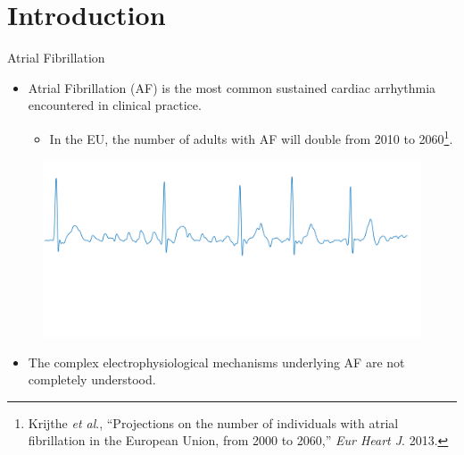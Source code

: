 \documentclass{beamer}
\begin{document}
	\begin{frame}
		\tableofcontents
	\end{frame}


\section{Introduction} 


	\begin{frame}{Atrial Fibrillation}	
		
		\begin{itemize}
			\item Atrial Fibrillation (AF) is the most common sustained cardiac arrhythmia encountered in clinical practice.
			\begin{itemize}
				\item  In the EU, the number of adults with AF will double from 2010 to 2060\footnote{Krijthe \textit{et al}., ``Projections on the number of individuals with atrial fibrillation in the European Union, from 2000 to 2060,'' \textit{Eur Heart J}. 2013.}.
			\end{itemize}
		\end{itemize}
		\begin{figure}
			\centering
			\includegraphics[scale=0.2]{fig/CinC2020/AF_ECG-eps-converted-to.pdf}
		\end{figure}
		\vspace{-0.8in}	
		\begin{itemize}
			\item The complex electrophysiological mechanisms underlying AF are not completely understood.
		\end{itemize}
	\end{frame}
\end{document}
